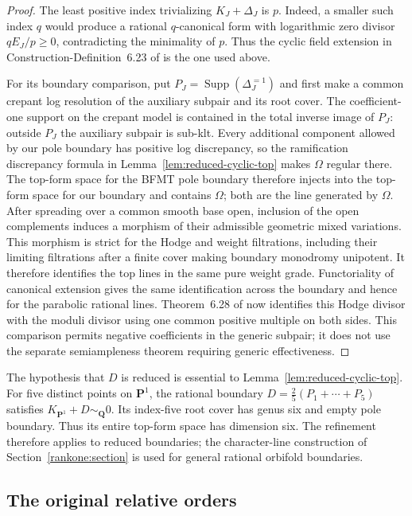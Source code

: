 \begin{proof}
The least positive index trivializing $K_J+\Delta_J$ is $p$.
Indeed, a smaller such index $q$ would produce a rational
$q$-canonical form with logarithmic zero divisor $qE_J/p\geq0$,
contradicting the minimality of $p$. Thus the cyclic field extension
in Construction-Definition~6.23 of \cite{BFMT} is the one used above.

For its boundary comparison, put
$P_J=\operatorname{Supp}(\Delta_J^{=1})$ and first make a common
crepant log resolution of the auxiliary subpair and its root cover. The
coefficient-one support on the crepant model is contained in the
total inverse image of $P_J$: outside $P_J$ the auxiliary subpair is
sub-klt. Every additional component allowed by our pole boundary
has positive log discrepancy, so the ramification discrepancy
formula in Lemma~\ref{lem:reduced-cyclic-top} makes $\Omega$
regular there. The top-form space for the BFMT pole boundary
therefore injects into the top-form space for our boundary and
contains $\Omega$; both are the line generated by $\Omega$.
After spreading over a common smooth base open, inclusion of the
open complements induces a morphism of their admissible geometric
mixed variations. This morphism is strict for the Hodge and weight
filtrations, including their limiting filtrations after a finite
cover making boundary monodromy unipotent. It therefore identifies
the top lines in the same pure weight grade. Functoriality
of canonical extension gives the same identification across the
boundary and hence for the parabolic rational lines. Theorem~6.28 of
\cite{BFMT} now identifies this Hodge divisor with the moduli
divisor using one common positive multiple on both sides. This
comparison permits negative coefficients in the generic subpair;
it does not use the separate semiampleness theorem requiring
generic effectiveness.
\end{proof}

\begin{remark}
The hypothesis that $D$ is reduced is essential to
Lemma~\ref{lem:reduced-cyclic-top}. For five distinct points on
$\mathbf P^1$, the rational boundary
$D=\frac25(P_1+\cdots+P_5)$ satisfies $K_{\mathbf P^1}+D\sim_{\mathbf Q}0$.
Its index-five root cover has genus six and empty pole boundary.
Thus its entire top-form space has dimension six. The refinement therefore applies to reduced boundaries; the
character-line construction of Section~\ref{rankone:section} is used
for general rational orbifold boundaries.
\end{remark}

\subsection{The original relative orders}


